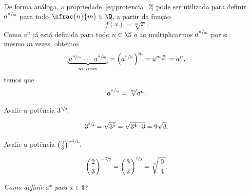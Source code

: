 De forma análoga, a propriedade~\eqref{eq:protencia_2} pode ser utilizada para
definir $a^{\sfrac{n}{m}}$ para todo \(\sfrac{n}{m}\in\Q\),
a partir da função
\[
    f(x) = \sqrt[m]{x}.
\]
Como $a^n$ já está definida para todo $n\in\N$
e ao multiplicarmos $a^{\sfrac{n}{m}}$ por si mesmo $m$ vezes, obtemos
\[
  \underbrace{\,a^{\sfrac{n}{m}}\,\cdots\,a^{\sfrac{n}{m}}\,}_{m\text{ vezes}}
  = \left(a^{\sfrac{n}{m}}\right)^m
  = a^{m \frac{n}{m}}
  = a^n,
\]
temos que
\begin{equation}
  a^{\sfrac{n}{m}} = \sqrt[m]{a^n}.
\end{equation}

\begin{example}
  Avalie a potência \(3^{\sfrac{5}{2}}\).

  \solution
  \[
    3^{\sfrac{5}{2}}
    = \sqrt{3^5}
    = \sqrt{3^4\cdot 3}
    = 9\sqrt{3}.
  \]
\end{example}

\begin{example}
  Avalie a potência \(\left(\frac{2}{3}\right)^{-\sfrac{2}{3}}\).

  \solution
  \[
    \left(\frac{2}{3}\right)^{-\sfrac{2}{3}}
    = \left(\frac{3}{2}\right)^{\sfrac{2}{3}}
    = \sqrt[3]{\,\dfrac{9}{4}\,}.
  \]
\end{example}

\emph{Como definir $a^x$ para $x\in\mathbb{I}$?}

